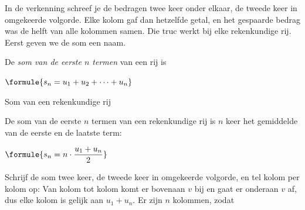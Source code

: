 In de verkenning schreef je de bedragen twee keer onder elkaar, de tweede keer in omgekeerde volgorde. Elke kolom gaf dan hetzelfde getal, en het gespaarde bedrag was de helft van alle kolommen samen. Die truc werkt bij elke rekenkundige rij. Eerst geven we de som een naam.

\begin{theorie}
De \emph{som van de eerste $n$ termen} van een rij is

\qquad $\formule{s_n = u_1 + u_2 + \cdots + u_n}$

\begin{stelling}{Som van een rekenkundige rij}
\begin{minipage}[t]{.6\linewidth}
\vspace{0pt}
De som van de eerste $n$ termen van een rekenkundige rij is $n$ keer het gemiddelde van de eerste en de laatste term:

\vspace{1mm}
\qquad $\formule{s_n = n \cdot \dfrac{u_1 + u_n}{2}}$
\end{minipage}\hfill
\begin{minipage}[t]{.34\linewidth}
\vspace{0pt}
\end{minipage}
\end{stelling}

\begin{bewijs}
Schrijf de som twee keer, de tweede keer in omgekeerde volgorde, en tel kolom per kolom op:
Van kolom tot kolom komt er bovenaan $v$ bij en gaat er onderaan $v$ af, dus elke kolom is gelijk aan $u_1 + u_n$. Er zijn $n$ kolommen, zodat
\end{bewijs}
\end{theorie}


